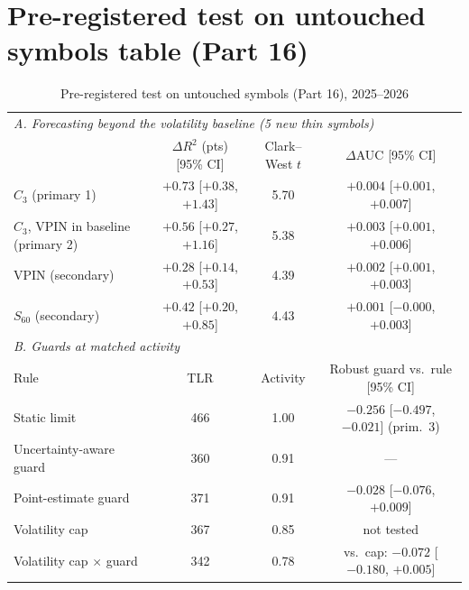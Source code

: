 \documentclass[12pt]{article}
\theoremstyle{definition}
\theoremstyle{remark}
\begin{document}
\section{Pre-registered test on untouched symbols table (Part 16)}
\FloatBarrier
\begin{table}[!tbp]\centering\small
\begin{threeparttable}
\caption{Pre-registered test on untouched symbols (Part 16), 2025--2026}\label{tab:p16}
\footnotesize\setlength{\tabcolsep}{2.5pt}
\begin{tabular}{lccc}
\toprule
\multicolumn{4}{l}{\emph{A. Forecasting beyond the volatility baseline (5 new thin symbols)}}\\
 & $\Delta R^2$ (pts) [95\% CI] & Clark--West $t$ & $\Delta$AUC [95\% CI]\\
\midrule
$\hat C_3$ (primary 1) & $+0.73$ [$+0.38$, $+1.43$] & 5.70 & $+0.004$ [$+0.001$, $+0.007$]\\
$\hat C_3$, VPIN in baseline (primary 2) & $+0.56$ [$+0.27$, $+1.16$] & 5.38 & $+0.003$ [$+0.001$, $+0.006$]\\
VPIN (secondary) & $+0.28$ [$+0.14$, $+0.53$] & 4.39 & $+0.002$ [$+0.001$, $+0.003$]\\
$S_{60}$ (secondary) & $+0.42$ [$+0.20$, $+0.85$] & 4.43 & $+0.001$ [$-0.000$, $+0.003$]\\
\midrule
\multicolumn{4}{l}{\emph{B. Guards at matched activity}}\\
Rule & TLR & Activity & Robust guard vs.\ rule [95\% CI]\\
\midrule
Static limit & 466 & 1.00 & $-0.256$ [$-0.497$, $-0.021$] (prim.\ 3)\\
Uncertainty-aware guard & 360 & 0.91 & ---\\
Point-estimate guard & 371 & 0.91 & $-0.028$ [$-0.076$, $+0.009$]\\
Volatility cap & 367 & 0.85 & not tested\\
Volatility cap $\times$ guard & 342 & 0.78 & vs.\ cap: $-0.072$ [$-0.180$, $+0.005$]\\
\bottomrule
\end{tabular}

\end{threeparttable}
\end{table}
\end{document}
